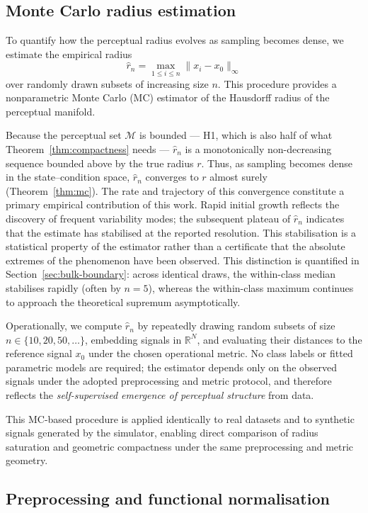 \documentclass[10pt]{article}
\theoremstyle{plain}
\theoremstyle{definition}
\theoremstyle{remark}
\begin{document}
\subsection{Monte Carlo radius estimation}
\label{sec:methods-radius}

To quantify how the perceptual radius evolves as sampling becomes dense, we 
estimate the empirical radius
\[
\hat r_n = \max_{1 \le i \le n} \|x_i - x_0\|_\infty
\]
over randomly drawn subsets of increasing size $n$.  
This procedure provides a nonparametric Monte Carlo (MC) estimator of the 
Hausdorff radius of the perceptual manifold.

Because the perceptual set $\mathcal{M}$ is bounded --- H1, which is also half
of what Theorem~\ref{thm:compactness} needs --- $\hat r_n$ is a monotonically
non-decreasing sequence bounded above by the true radius $r$.  
Thus, as sampling becomes dense in the state--condition space, $\hat r_n$ 
converges to $r$ almost surely (Theorem~\ref{thm:mc}).  
The rate and trajectory of this convergence constitute a primary empirical
contribution of this work. Rapid initial growth reflects the discovery of
frequent variability modes; the subsequent plateau of $\hat{r}_n$ indicates
that the estimate has stabilised at the reported resolution. This stabilisation
is a statistical property of the estimator rather than a certificate that the
absolute extremes of the phenomenon have been observed. This distinction is
quantified in Section~\ref{sec:bulk-boundary}: across identical draws, the
within-class median stabilises rapidly (often by $n=5$), whereas the
within-class maximum continues to approach the theoretical supremum
asymptotically.

Operationally, we compute $\hat r_n$ by repeatedly drawing random subsets of 
size $n \in \{10, 20, 50, \dots\}$, embedding signals in $\mathbb{R}^N$, 
and evaluating their distances to the reference signal $x_0$ under the chosen
operational metric.
No class labels or fitted parametric models are required; the estimator depends
only on the observed signals under the adopted preprocessing and metric protocol,
and therefore reflects the \emph{self-supervised emergence of perceptual structure}
from data.

This MC-based procedure is applied identically to real datasets and to 
synthetic signals generated by the simulator, enabling direct comparison of 
radius saturation and geometric compactness under the same preprocessing and 
metric geometry.


\subsection{Preprocessing and functional normalisation}
\end{document}
